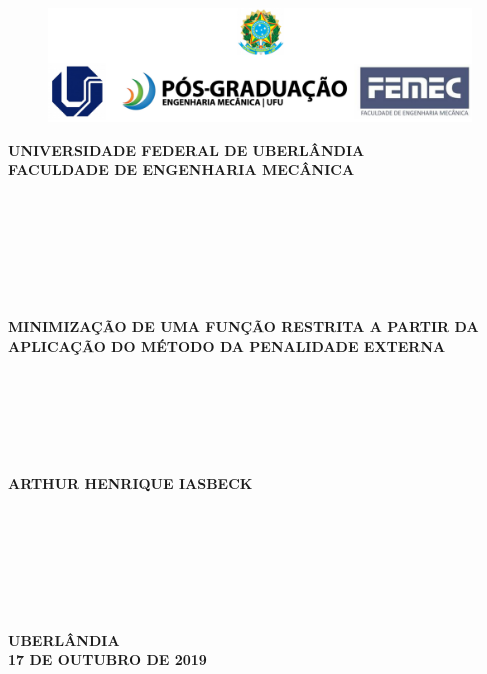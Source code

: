 \documentclass[12pt]{article}
\begin{document}
	\singlespacing %
	
	\thispagestyle{empty}
	
	\begin{figure}[H]
		\centering
		\includegraphics[width=\linewidth]{cabecalho.png}
	\end{figure}
	
	\begin{center}
		\large
		\textbf{UNIVERSIDADE FEDERAL DE UBERLÂNDIA} \\ \vspace{0.3cm}
		\textbf{FACULDADE DE ENGENHARIA MECÂNICA} \\~\\~\\~\\~\\~\\~\\~\\
		\Large
		\textbf{MINIMIZAÇÃO DE UMA FUNÇÃO RESTRITA A PARTIR DA APLICAÇÃO DO MÉTODO DA PENALIDADE EXTERNA} \\~\\~\\~\\~\\~\\~\\
		\large
		\textbf{ARTHUR HENRIQUE IASBECK} \\~\\~\\~\\~\\~\\~\\~\\
		\large
		\textbf{UBERLÂNDIA} \\
		\textbf{17 DE OUTUBRO DE 2019}
	\end{center}
	\newpage
	\restoregeometry
	
	\setcounter{page}{1} %
	
\end{document}
